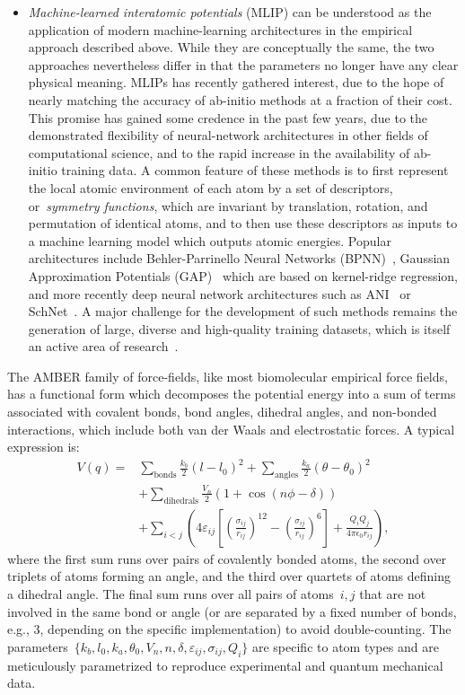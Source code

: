 \begin{itemize}
    \item{\textit{Machine-learned interatomic potentials} (MLIP) can be understood as the application of modern machine-learning architectures in the empirical approach described above. While they are conceptually the same, the two approaches nevertheless differ in that the parameters no longer have any clear physical meaning. MLIPs has recently gathered interest, due to the hope of nearly matching the accuracy of ab-initio methods at a fraction of their cost. This promise has gained some credence in the past few years, due to the demonstrated flexibility of neural-network architectures in other fields of computational science, and to the rapid increase in the availability of ab-initio training data.
    A common feature of these methods is to first represent the local atomic environment of each atom by a set of descriptors, or~\textit{symmetry functions}, which are invariant by translation, rotation, and permutation of identical atoms, and to then use these descriptors as inputs to a machine learning model which outputs atomic energies. Popular architectures include Behler-Parrinello Neural Networks (BPNN)~\cite{BP07}, Gaussian Approximation Potentials (GAP)~\cite{BKKM10} which are based on kernel-ridge regression, and more recently deep neural network architectures such as ANI~\cite{SIBR17} or SchNet~\cite{SKT+17}. A major challenge for the development of such methods remains the generation of large, diverse and high-quality training datasets, which is itself an active area of research~\cite{GET+20}.
    } %
\end{itemize}

The AMBER family of force-fields, like most biomolecular empirical force fields, has a functional form which decomposes the potential energy into a sum of terms associated with covalent bonds, bond angles, dihedral angles, and non-bonded interactions, which include both van der Waals and electrostatic forces. A typical expression is:
\begin{equation}
\begin{split}
    \label{eq:01:amber}
    V(q) = &\sum_{\text{bonds}} \frac{k_b}{2}(l-l_0)^2 + \sum_{\text{angles}} \frac{k_a}{2}(\theta-\theta_0)^2 \\
    &+ \sum_{\text{dihedrals}} \frac{V_n}{2}\left(1+\cos(n\phi-\delta)\right) \\
    &+ \sum_{i<j}\left(4\varepsilon_{ij}\left[\left(\frac{\sigma_{ij}}{r_{ij}}\right)^{12}-\left(\frac{\sigma_{ij}}{r_{ij}}\right)^6\right] + \frac{Q_iQ_j}{4\pi\epsilon_0 r_{ij}}\right),
\end{split}
\end{equation}
where the first sum runs over pairs of covalently bonded atoms, the second over triplets of atoms forming an angle, and the third over quartets of atoms defining a dihedral angle. The final sum runs over all pairs of atoms~$i,j$ that are not involved in the same bond or angle (or are separated by a fixed number of bonds, e.g., 3, depending on the specific implementation) to avoid double-counting. The parameters~$\{k_b,l_0,k_a,\theta_0,V_n,n,\delta,\varepsilon_{ij},\sigma_{ij},Q_i\}$ are specific to atom types and are meticulously parametrized to reproduce experimental and quantum mechanical data.

